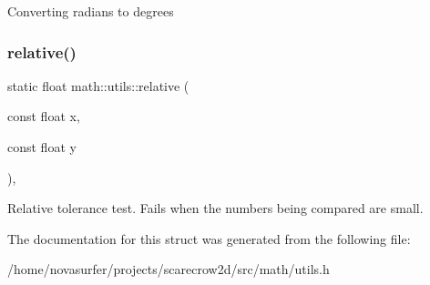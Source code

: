 Converting radians to degrees \mbox{\label{structmath_1_1utils_ae8c19c230a03b2a8b8ca6f3604fa4648}} 
\subsubsection{\texorpdfstring{relative()}{relative()}}
{\footnotesize\ttfamily static float math\+::utils\+::relative (\begin{DoxyParamCaption}\item[{const float}]{x,  }\item[{const float}]{y }\end{DoxyParamCaption})\hspace{0.3cm}{\ttfamily [inline]}, {\ttfamily [static]}}

Relative tolerance test. Fails when the numbers being compared are small. 

The documentation for this struct was generated from the following file\+:\begin{DoxyCompactItemize}
\item 
/home/novasurfer/projects/scarecrow2d/src/math/utils.\+h\end{DoxyCompactItemize}

